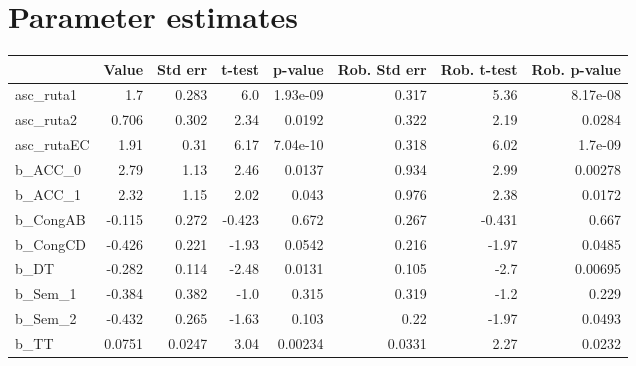 \section{Parameter estimates}
\begin{tabular}{lrrrrrrr}
\toprule
{} &  Value &  Std err &  t-test &  p-value &  Rob. Std err &  Rob. t-test &  Rob. p-value \\
\midrule
asc\_ruta1  &    1.7 &    0.283 &     6.0 & 1.93e-09 &         0.317 &         5.36 &      8.17e-08 \\
asc\_ruta2  &  0.706 &    0.302 &    2.34 &   0.0192 &         0.322 &         2.19 &        0.0284 \\
asc\_rutaEC &   1.91 &     0.31 &    6.17 & 7.04e-10 &         0.318 &         6.02 &       1.7e-09 \\
b\_ACC\_0    &   2.79 &     1.13 &    2.46 &   0.0137 &         0.934 &         2.99 &       0.00278 \\
b\_ACC\_1    &   2.32 &     1.15 &    2.02 &    0.043 &         0.976 &         2.38 &        0.0172 \\
b\_CongAB   & -0.115 &    0.272 &  -0.423 &    0.672 &         0.267 &       -0.431 &         0.667 \\
b\_CongCD   & -0.426 &    0.221 &   -1.93 &   0.0542 &         0.216 &        -1.97 &        0.0485 \\
b\_DT       & -0.282 &    0.114 &   -2.48 &   0.0131 &         0.105 &         -2.7 &       0.00695 \\
b\_Sem\_1    & -0.384 &    0.382 &    -1.0 &    0.315 &         0.319 &         -1.2 &         0.229 \\
b\_Sem\_2    & -0.432 &    0.265 &   -1.63 &    0.103 &          0.22 &        -1.97 &        0.0493 \\
b\_TT       & 0.0751 &   0.0247 &    3.04 &  0.00234 &        0.0331 &         2.27 &        0.0232 \\
\bottomrule
\end{tabular}

